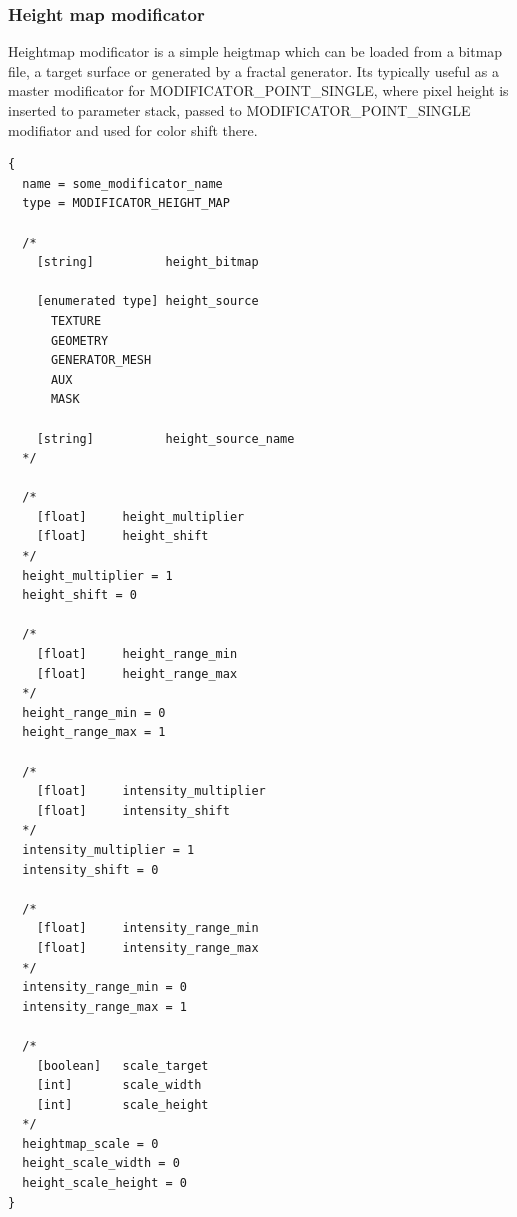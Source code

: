 \documentclass[9pt]{article}
\begin{document}
\subsubsection{Height map modificator}

Heightmap modificator is a simple heigtmap which can be loaded from a bitmap
file, a target surface or generated by a fractal generator. Its typically useful
as a master modificator for MODIFICATOR\_POINT\_SINGLE, where pixel height
is inserted to parameter stack, passed to MODIFICATOR\_POINT\_SINGLE modifiator
and used for color shift there.

\begin{verbatim}
{
  name = some_modificator_name
  type = MODIFICATOR_HEIGHT_MAP
  
  /*
    [string]          height_bitmap
    
    [enumerated type] height_source
      TEXTURE
      GEOMETRY
      GENERATOR_MESH
      AUX
      MASK
    
    [string]          height_source_name
  */
    
  /*    
    [float]     height_multiplier
    [float]     height_shift
  */
  height_multiplier = 1
  height_shift = 0
  
  /*
    [float]     height_range_min
    [float]     height_range_max
  */  
  height_range_min = 0
  height_range_max = 1
  
  /*    
    [float]     intensity_multiplier
    [float]     intensity_shift
  */
  intensity_multiplier = 1
  intensity_shift = 0
  
  /*
    [float]     intensity_range_min
    [float]     intensity_range_max
  */  
  intensity_range_min = 0
  intensity_range_max = 1

  /*  
    [boolean]   scale_target
    [int]       scale_width
    [int]       scale_height
  */
  heightmap_scale = 0
  height_scale_width = 0
  height_scale_height = 0
}
\end{verbatim}
\end{document}
